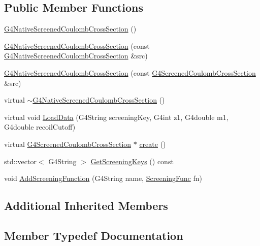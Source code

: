 \subsection*{Public Member Functions}
\begin{DoxyCompactItemize}
\item 
\hyperlink{classG4NativeScreenedCoulombCrossSection_a417f83661f5c07bad552de49c2e5661c}{G4\+Native\+Screened\+Coulomb\+Cross\+Section} ()
\item 
\hyperlink{classG4NativeScreenedCoulombCrossSection_a14ed45f2a40f067aa322117d1decf3e4}{G4\+Native\+Screened\+Coulomb\+Cross\+Section} (const \hyperlink{classG4NativeScreenedCoulombCrossSection}{G4\+Native\+Screened\+Coulomb\+Cross\+Section} \&src)
\item 
\hyperlink{classG4NativeScreenedCoulombCrossSection_ab7469968817dc11e563c6c65aa541a40}{G4\+Native\+Screened\+Coulomb\+Cross\+Section} (const \hyperlink{classG4ScreenedCoulombCrossSection}{G4\+Screened\+Coulomb\+Cross\+Section} \&src)
\item 
virtual \hyperlink{classG4NativeScreenedCoulombCrossSection_a2b608ed8475dfbc5fa2468bf870a8d8a}{$\sim$\+G4\+Native\+Screened\+Coulomb\+Cross\+Section} ()
\item 
virtual void \hyperlink{classG4NativeScreenedCoulombCrossSection_ab616397fbc1b8275cdc68a93268e80ad}{Load\+Data} (G4\+String screening\+Key, G4int z1, G4double m1, G4double recoil\+Cutoff)
\item 
virtual \hyperlink{classG4ScreenedCoulombCrossSection}{G4\+Screened\+Coulomb\+Cross\+Section} $\ast$ \hyperlink{classG4NativeScreenedCoulombCrossSection_a13aac6dd8ff1af94467217d261b81898}{create} ()
\item 
std\+::vector$<$ G4\+String $>$ \hyperlink{classG4NativeScreenedCoulombCrossSection_a04c8348f479aabc692ab4818e712e1e5}{Get\+Screening\+Keys} () const 
\item 
void \hyperlink{classG4NativeScreenedCoulombCrossSection_ac068a0ceb26658fed8c15bfb67b26062}{Add\+Screening\+Function} (G4\+String name, \hyperlink{classG4NativeScreenedCoulombCrossSection_a0b6a4f30e2047969238512fabfa49b11}{Screening\+Func} fn)
\end{DoxyCompactItemize}
\subsection*{Additional Inherited Members}


\subsection{Member Typedef Documentation}
